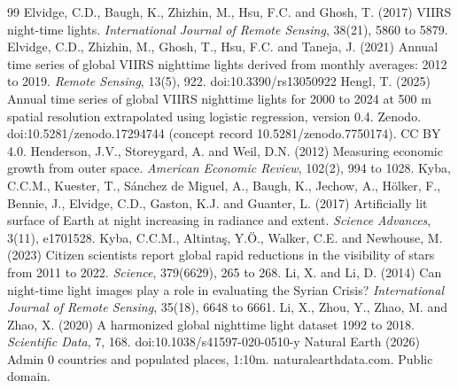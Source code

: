\documentclass[11pt,a4paper]{article}
\begin{document}
\begin{thebibliography}{99}
 Elvidge, C.D., Baugh, K., Zhizhin, M., Hsu, F.C. and Ghosh, T. (2017) VIIRS night-time lights. \emph{International Journal of Remote Sensing}, 38(21), 5860 to 5879.
 Elvidge, C.D., Zhizhin, M., Ghosh, T., Hsu, F.C. and Taneja, J. (2021) Annual time series of global VIIRS nighttime lights derived from monthly averages: 2012 to 2019. \emph{Remote Sensing}, 13(5), 922. doi:10.3390/rs13050922
 Hengl, T. (2025) Annual time series of global VIIRS nighttime lights for 2000 to 2024 at 500 m spatial resolution extrapolated using logistic regression, version 0.4. Zenodo. doi:10.5281/zenodo.17294744 (concept record 10.5281/zenodo.7750174). CC BY 4.0.
 Henderson, J.V., Storeygard, A. and Weil, D.N. (2012) Measuring economic growth from outer space. \emph{American Economic Review}, 102(2), 994 to 1028.
 Kyba, C.C.M., Kuester, T., S\'anchez de Miguel, A., Baugh, K., Jechow, A., H\"olker, F., Bennie, J., Elvidge, C.D., Gaston, K.J. and Guanter, L. (2017) Artificially lit surface of Earth at night increasing in radiance and extent. \emph{Science Advances}, 3(11), e1701528.
 Kyba, C.C.M., Altinta\c{s}, Y.\"O., Walker, C.E. and Newhouse, M. (2023) Citizen scientists report global rapid reductions in the visibility of stars from 2011 to 2022. \emph{Science}, 379(6629), 265 to 268.
 Li, X. and Li, D. (2014) Can night-time light images play a role in evaluating the Syrian Crisis? \emph{International Journal of Remote Sensing}, 35(18), 6648 to 6661.
 Li, X., Zhou, Y., Zhao, M. and Zhao, X. (2020) A harmonized global nighttime light dataset 1992 to 2018. \emph{Scientific Data}, 7, 168. doi:10.1038/s41597-020-0510-y
 Natural Earth (2026) Admin 0 countries and populated places, 1:10m. naturalearthdata.com. Public domain.
\end{thebibliography}
\end{document}
